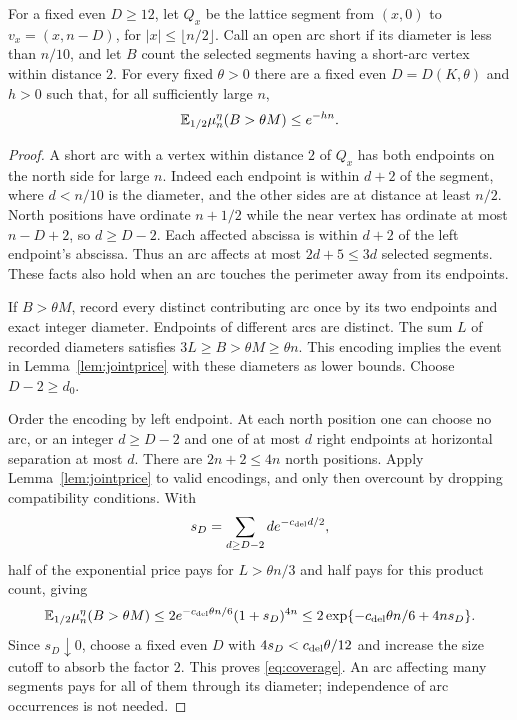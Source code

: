 \begin{lemma}\label{lem:coverage}
For a fixed even $D\ge12$, let $Q_x$ be the lattice segment from $(x,0)$ to $v_x=(x,n-D)$, for $|x|\le\lfloor n/2\rfloor$. Call an open arc short if its diameter is less than $n/10$, and let $B$ count the selected segments having a short-arc vertex within distance $2$. For every fixed $\theta>0$ there are a fixed even $D=D(K,\theta)$ and $h>0$ such that, for all sufficiently large $n$,
\begin{equation}\label{eq:coverage}
 \mathbb E_{1/2}\mu_n^\eta(B>\theta M)\le e^{-hn}.
\end{equation}
\end{lemma}
\begin{proof}
A short arc with a vertex within distance $2$ of $Q_x$ has both endpoints on the north side for large $n$. Indeed each endpoint is within $d+2$ of the segment, where $d<n/10$ is the diameter, and the other sides are at distance at least $n/2$. North positions have ordinate $n+1/2$ while the near vertex has ordinate at most $n-D+2$, so $d\ge D-2$. Each affected abscissa is within $d+2$ of the left endpoint's abscissa. Thus an arc affects at most $2d+5\le3d$ selected segments. These facts also hold when an arc touches the perimeter away from its endpoints.

If $B>\theta M$, record every distinct contributing arc once by its two endpoints and exact integer diameter. Endpoints of different arcs are distinct. The sum $L$ of recorded diameters satisfies $3L\ge B>\theta M\ge\theta n$. This encoding implies the event in Lemma~\ref{lem:jointprice} with these diameters as lower bounds. Choose $D-2\ge d_0$.

Order the encoding by left endpoint. At each north position one can choose no arc, or an integer $d\ge D-2$ and one of at most $d$ right endpoints at horizontal separation at most $d$. There are $2n+2\le4n$ north positions. Apply Lemma~\ref{lem:jointprice} to valid encodings, and only then overcount by dropping compatibility conditions. With
\[
 s_D=\sum_{d\ge D-2}d e^{-c_{\rm del}d/2},
\]
half of the exponential price pays for $L>\theta n/3$ and half pays for this product count, giving
\[
 \mathbb E_{1/2}\mu_n^\eta(B>\theta M)
 \le2e^{-c_{\rm del}\theta n/6}(1+s_D)^{4n}
 \le2\exp\{-c_{\rm del}\theta n/6+4ns_D\}.
\]
Since $s_D\downarrow0$, choose a fixed even $D$ with $4s_D<c_{\rm del}\theta/12$ and increase the size cutoff to absorb the factor $2$. This proves \eqref{eq:coverage}. An arc affecting many segments pays for all of them through its diameter; independence of arc occurrences is not needed.
\end{proof}

